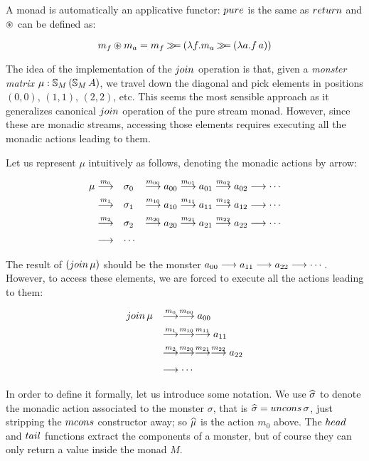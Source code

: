 A monad is automatically an applicative functor:
$\apure$ is the same as $\return$ and $\circledast$ can be defined as:

$$
m_f\circledast m_a = m_f \mathbin{\gg\!\!=} (\lambda f. m_a \mathbin{\gg\!\!=} (\lambda a. f\,a))
$$

The idea of the implementation of the $\join$ operation is that,
given a {\em monster matrix} $\mu:\mathbb{S}_{M}\,(\mathbb{S}_{M}\,A)$, we travel down the diagonal and pick elements in positions $(0,0)$, $(1,1)$, $(2,2)$, etc.
This seems the most sensible approach as it generalizes canonical $\join$ operation of the pure stream monad.
However, since these are monadic streams, accessing those elements requires executing all the monadic actions leading to them.

Let us represent $\mu$ intuitively as follows, denoting the monadic actions by arrow:

$$
\begin{array}[t]{rll}
\mu \stackrel{m_0}{\longrightarrow} 
 & \sigma_0 
 & \stackrel{m_{00}}{\longrightarrow} a_{00} \stackrel{m_{01}}{\longrightarrow} a_{01} \stackrel{m_{02}}{\longrightarrow} a_{02} \stackrel{}{\longrightarrow} \cdots\\[5pt]
\stackrel{m_1}{\longrightarrow} 
 & \sigma_1 
 & \stackrel{m_{10}}{\longrightarrow} a_{10} \stackrel{m_{11}}{\longrightarrow} a_{11} \stackrel{m_{12}}{\longrightarrow} a_{12} \stackrel{}{\longrightarrow} \cdots\\[5pt]
\stackrel{m_2}{\longrightarrow} 
 & \sigma_2
 & \stackrel{m_{20}}{\longrightarrow} a_{20} \stackrel{m_{21}}{\longrightarrow} a_{21} \stackrel{m_{22}}{\longrightarrow} a_{22} \stackrel{}{\longrightarrow} \cdots\\[5pt]
\stackrel{}{\longrightarrow} & \cdots
\end{array}
$$

The result of $(\join\,\mu)$ should be the monster $a_{00} \stackrel{}{\longrightarrow} a_{11}\stackrel{}{\longrightarrow} a_{22} \stackrel{}{\longrightarrow} \cdots$.
However, to access these elements, we are forced to execute all the actions leading to them:

$$
\begin{array}{ll}
\join\,\mu 
& \larrow{m_0}\larrow{m_{00}} a_{00}\\[5pt]
& \larrow{m_1}\larrow{m_{10}}\larrow{m_{11}} a_{11}\\[5pt]
& \larrow{m_2}\larrow{m_{20}}\larrow{m_{21}}\larrow{m_{22}} a_{22}\\[5pt]
& \larrow{} \cdots
\end{array}
$$

In order to define it formally, let us introduce some notation.
We use $\widehat{\sigma}$ to denote the monadic action associated to the monster $\sigma$, that is $ \unc{\sigma} = \uncons\,\sigma $, just stripping the $\mcons$ constructor away; so $\widehat{\mu}$ is the action $m_0$ above.
The $\head$ and $\tail$ functions extract the components of a monster, but of course they can only return a value inside the monad $M$.

